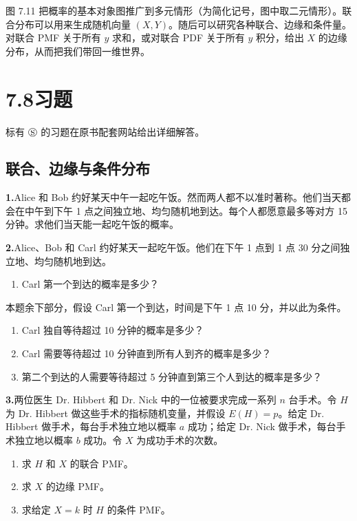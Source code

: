 \documentclass[UTF8, 12pt, fontset=fandol, oneside]{ctexart}
\begin{document}
图 7.11 把概率的基本对象图推广到多元情形（为简化记号，图中取二元情形）。联合分布可以用来生成随机向量 $(X,Y)$。随后可以研究各种联合、边缘和条件量。对联合 PMF 关于所有 $y$ 求和，或对联合 PDF 关于所有 $y$ 积分，给出 $X$ 的边缘分布，从而把我们带回一维世界。

\section*{7.8\quad 习题}

标有 $\circledS$ 的习题在原书配套网站给出详细解答。

\subsection*{联合、边缘与条件分布}

\noindent\textbf{1.}\quad Alice 和 Bob 约好某天中午一起吃午饭。然而两人都不以准时著称。他们当天都会在中午到下午 1 点之间独立地、均匀随机地到达。每个人都愿意最多等对方 15 分钟。求他们当天能一起吃午饭的概率。

\noindent\textbf{2.}\quad Alice、Bob 和 Carl 约好某天一起吃午饭。他们在下午 1 点到 1 点 30 分之间独立地、均匀随机地到达。
\begin{enumerate}
  \item[(a)] Carl 第一个到达的概率是多少？
\end{enumerate}
本题余下部分，假设 Carl 第一个到达，时间是下午 1 点 10 分，并以此为条件。
\begin{enumerate}
  \item[(b)] Carl 独自等待超过 10 分钟的概率是多少？
  \item[(c)] Carl 需要等待超过 10 分钟直到所有人到齐的概率是多少？
  \item[(d)] 第二个到达的人需要等待超过 5 分钟直到第三个人到达的概率是多少？
\end{enumerate}

\noindent\textbf{3.}\quad 两位医生 Dr. Hibbert 和 Dr. Nick 中的一位被要求完成一系列 $n$ 台手术。令 $H$ 为 Dr. Hibbert 做这些手术的指标随机变量，并假设 $E(H)=p$。给定 Dr. Hibbert 做手术，每台手术独立地以概率 $a$ 成功；给定 Dr. Nick 做手术，每台手术独立地以概率 $b$ 成功。令 $X$ 为成功手术的次数。
\begin{enumerate}
  \item[(a)] 求 $H$ 和 $X$ 的联合 PMF。
  \item[(b)] 求 $X$ 的边缘 PMF。
  \item[(c)] 求给定 $X=k$ 时 $H$ 的条件 PMF。
\end{enumerate}
\end{document}
